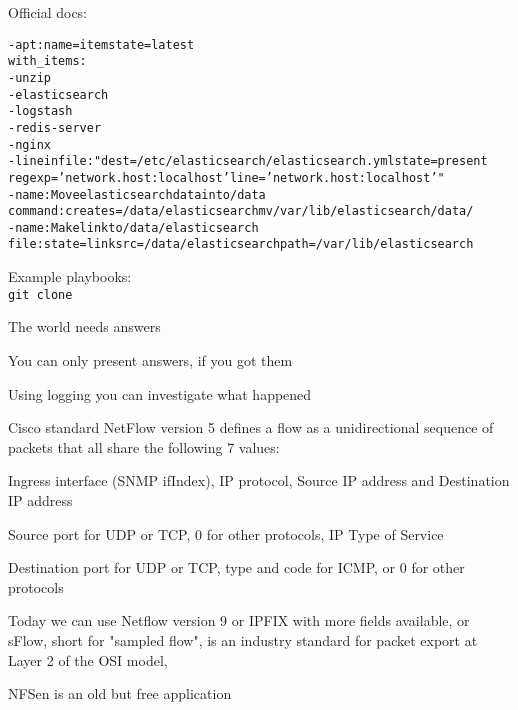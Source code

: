 \documentclass[Screen16to9,17pt]{foils}
\begin{document}
Official docs:\\




\begin{alltt}\small
- apt: name={{ item }} state=latest
  with_items:
        - unzip
        - elasticsearch
        - logstash
        - redis-server
        - nginx
- lineinfile: "dest=/etc/elasticsearch/elasticsearch.yml state=present
  regexp='network.host: localhost' line='network.host: localhost'"
- name: Move elasticsearch data into /data
  command: creates=/data/elasticsearch mv /var/lib/elasticsearch /data/
- name: Make link to /data/elasticsearch
  file: state=link src=/data/elasticsearch path=/var/lib/elasticsearch
\end{alltt}

Example playbooks:\\
\verb+git clone +






\begin{list2}
\item The world needs answers
\item You can only present answers, if you got them

\item Using logging you can investigate what happened
\end{list2}





\begin{slidelist}
\item Cisco standard NetFlow version 5 defines a flow as a unidirectional sequence of packets that all share the following 7 values:
\begin{list2}
\item Ingress interface (SNMP ifIndex), IP protocol, Source IP address and Destination IP address
\item Source port for UDP or TCP, 0 for other protocols, IP Type of Service
\item Destination port for UDP or TCP, type and code for ICMP, or 0 for other protocols
\end{list2}
\item Today we can use Netflow version 9 or IPFIX with more fields available, or  sFlow, short for "sampled flow", is an industry standard for packet export at Layer 2 of the OSI model, \\
\item NFSen is an old but free application
\end{slidelist}
\end{document}
